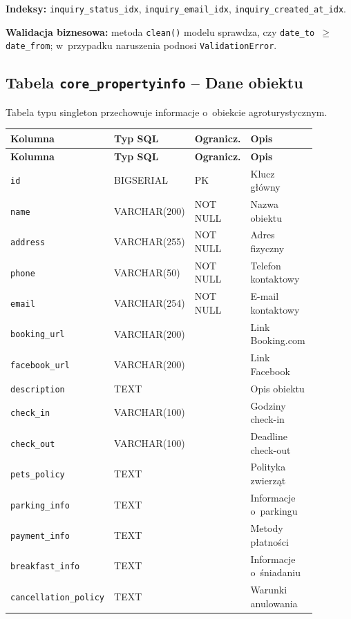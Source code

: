 \documentclass[12pt,a4paper]{article}
\begin{document}
\textbf{Indeksy:} \texttt{inquiry\_status\_idx}, \texttt{inquiry\_email\_idx},
\texttt{inquiry\_created\_at\_idx}.

\textbf{Walidacja biznesowa:} metoda \texttt{clean()} modelu sprawdza, czy
\texttt{date\_to $\geq$ date\_from}; w~przypadku naruszenia podnosi
\texttt{ValidationError}.

\subsection{Tabela \texttt{core\_propertyinfo} -- Dane obiektu}

Tabela typu singleton przechowuje informacje o~obiekcie agroturystycznym.

\begin{longtable}{p{0.22\linewidth}p{0.18\linewidth}p{0.13\linewidth}p{0.35\linewidth}}
\toprule
\textbf{Kolumna} & \textbf{Typ SQL} & \textbf{Ogranicz.} & \textbf{Opis} \\
\midrule
\endfirsthead
\toprule
\textbf{Kolumna} & \textbf{Typ SQL} & \textbf{Ogranicz.} & \textbf{Opis} \\
\midrule
\endhead
\texttt{id} & BIGSERIAL & PK & Klucz główny \\
\texttt{name} & VARCHAR(200) & NOT NULL & Nazwa obiektu \\
\texttt{address} & VARCHAR(255) & NOT NULL & Adres fizyczny \\
\texttt{phone} & VARCHAR(50) & NOT NULL & Telefon kontaktowy \\
\texttt{email} & VARCHAR(254) & NOT NULL & E-mail kontaktowy \\
\texttt{booking\_url} & VARCHAR(200) & & Link Booking.com \\
\texttt{facebook\_url} & VARCHAR(200) & & Link Facebook \\
\texttt{description} & TEXT & & Opis obiektu \\
\texttt{check\_in} & VARCHAR(100) & & Godziny check-in \\
\texttt{check\_out} & VARCHAR(100) & & Deadline check-out \\
\texttt{pets\_policy} & TEXT & & Polityka zwierząt \\
\texttt{parking\_info} & TEXT & & Informacje o~parkingu \\
\texttt{payment\_info} & TEXT & & Metody płatności \\
\texttt{breakfast\_info} & TEXT & & Informacje o~śniadaniu \\
\texttt{cancellation\_policy} & TEXT & & Warunki anulowania \\
\bottomrule
\end{longtable}
\end{document}
